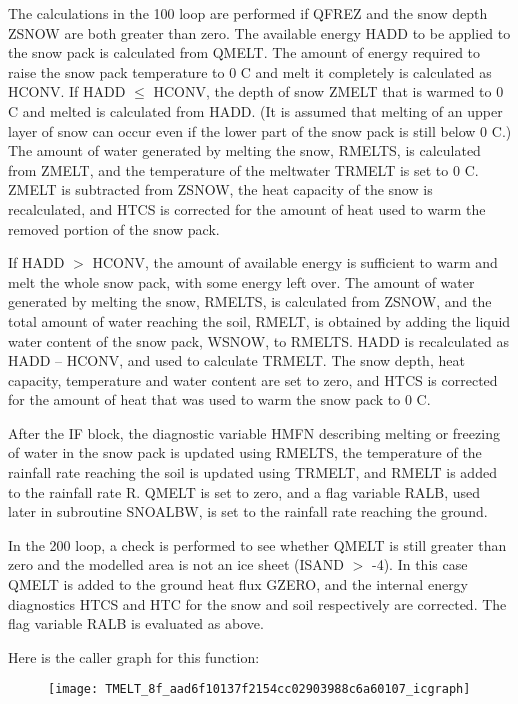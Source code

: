 The calculations in the 100 loop are performed if Q\+F\+R\+E\+Z and the snow depth Z\+S\+N\+O\+W are both greater than zero. The available energy H\+A\+D\+D to be applied to the snow pack is calculated from Q\+M\+E\+L\+T. The amount of energy required to raise the snow pack temperature to 0 C and melt it completely is calculated as H\+C\+O\+N\+V. If H\+A\+D\+D $\leq$ H\+C\+O\+N\+V, the depth of snow Z\+M\+E\+L\+T that is warmed to 0 C and melted is calculated from H\+A\+D\+D. (It is assumed that melting of an upper layer of snow can occur even if the lower part of the snow pack is still below 0 C.) The amount of water generated by melting the snow, R\+M\+E\+L\+T\+S, is calculated from Z\+M\+E\+L\+T, and the temperature of the meltwater T\+R\+M\+E\+L\+T is set to 0 C. Z\+M\+E\+L\+T is subtracted from Z\+S\+N\+O\+W, the heat capacity of the snow is recalculated, and H\+T\+C\+S is corrected for the amount of heat used to warm the removed portion of the snow pack.

If H\+A\+D\+D $>$ H\+C\+O\+N\+V, the amount of available energy is sufficient to warm and melt the whole snow pack, with some energy left over. The amount of water generated by melting the snow, R\+M\+E\+L\+T\+S, is calculated from Z\+S\+N\+O\+W, and the total amount of water reaching the soil, R\+M\+E\+L\+T, is obtained by adding the liquid water content of the snow pack, W\+S\+N\+O\+W, to R\+M\+E\+L\+T\+S. H\+A\+D\+D is recalculated as H\+A\+D\+D – H\+C\+O\+N\+V, and used to calculate T\+R\+M\+E\+L\+T. The snow depth, heat capacity, temperature and water content are set to zero, and H\+T\+C\+S is corrected for the amount of heat that was used to warm the snow pack to 0 C.

After the I\+F block, the diagnostic variable H\+M\+F\+N describing melting or freezing of water in the snow pack is updated using R\+M\+E\+L\+T\+S, the temperature of the rainfall rate reaching the soil is updated using T\+R\+M\+E\+L\+T, and R\+M\+E\+L\+T is added to the rainfall rate R. Q\+M\+E\+L\+T is set to zero, and a flag variable R\+A\+L\+B, used later in subroutine S\+N\+O\+A\+L\+B\+W, is set to the rainfall rate reaching the ground.

In the 200 loop, a check is performed to see whether Q\+M\+E\+L\+T is still greater than zero and the modelled area is not an ice sheet (I\+S\+A\+N\+D $>$ -\/4). In this case Q\+M\+E\+L\+T is added to the ground heat flux G\+Z\+E\+R\+O, and the internal energy diagnostics H\+T\+C\+S and H\+T\+C for the snow and soil respectively are corrected. The flag variable R\+A\+L\+B is evaluated as above.

Here is the caller graph for this function\+:\nopagebreak
\begin{figure}[H]
\begin{center}
\leavevmode
\texttt{[image: TMELT\_8f\_aad6f10137f2154cc02903988c6a60107\_icgraph]}
\end{center}
\end{figure}


